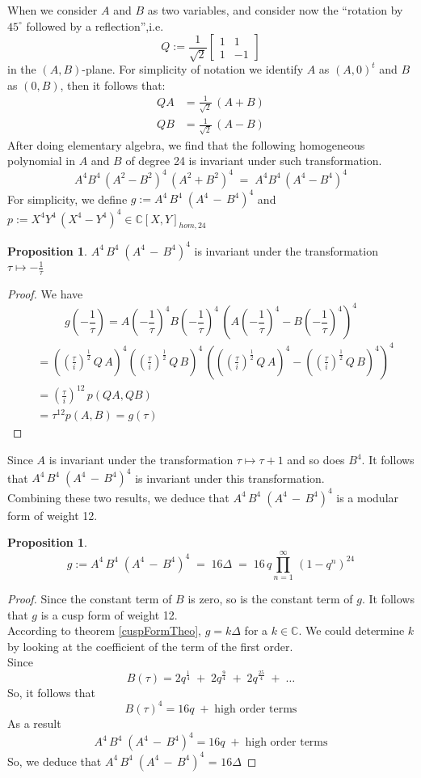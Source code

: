 \documentclass[12pt]{article}
\theoremstyle{definition}
\newtheorem{prop}[theorem]{Proposition}
\numberwithin{equation}{theorem}
\numberwithin{figure}{theorem}
\newcommand{\polyAB}[2]{\ensuremath{#1^4#2^4\,(#1^4 - #2^4)^4}}
\newcommand{\Complex}{\ensuremath{\mathbb{C}}}
\newcommand{\imaginary}{\ensuremath{i}}
\newcommand{\twoFourDegreeAB}{\ensuremath{A^4\,B^4\;(A^4 \,-\, B^4)^4}}
\begin{document}
When we consider $A$ and $B$ as two variables, and consider now the ``rotation by $45^{\circ}$ followed by a reflection'',i.e.
\[
	Q := \frac{1}{\sqrt{2}}
	\left [
	\begin{matrix}
		1 & 1\\
		1 & -1
	\end{matrix}
	\right]
\] in the $(A,B)$-plane. For simplicity of notation we identify $A$ as $(A,0)^t$ and $B$ as $(0,B)$, then it follows that:
\begin{align*}
	QA &= \frac{1}{\sqrt{2}}\,(A + B)\\
	QB &= \frac{1}{\sqrt{2}}\,(A - B) 
\end{align*}
After doing elementary algebra, we find that the following homogeneous polynomial in $A$ and $B$ of degree 24 is invariant under such transformation.
\[
	A^4B^4 \,(A^2 - B^2)^4 \, (A^2 + B^2)^4 \; = \; A^4B^4\,(A^4 - B^4)^4
\]
For simplicity, we define $g := {\twoFourDegreeAB}$  and $p := \polyAB{X}{Y} \in \Complex[X,Y]_{hom,24}$
\begin{prop}\label{twoFourABInvarProp}
	{\twoFourDegreeAB} is invariant under the transformation 
	$\tau \mapsto -\frac{1}{\tau}$
\end{prop}
\begin{proof}
We have
\[
	g(-\frac{1}{\tau}) = \polyAB{A(-\frac{1}{\tau})}{B(-\frac{1}{\tau})}
\]
\begin{align*}
 &= \polyAB{((\frac{\tau}{\imaginary})^{\frac{1}{2}}\,Q\,A)}{((\frac{\tau}{\imaginary})^{\frac{1}{2}}\,Q\,B)}\\
 &= (\frac{\tau}{\imaginary})^{12} \, p(QA, QB) \\
 &= \tau^{12}p(A,B) = g(\tau)
\end{align*}
\end{proof}
Since $A$ is invariant under the transformation $\tau \mapsto \tau + 1$ and so does $B^4$. It follows that {\twoFourDegreeAB} is invariant under this transformation.\\
Combining these two results, we deduce that $\twoFourDegreeAB$ is a modular form of weight 12.
\begin{prop}\label{twoFourDegABDelta}
\[
	g := {\twoFourDegreeAB} \;= \; 16 \Delta \;= \; 16\,q\prod_{n = 1}^{\infty}\,(1 - q^n)^{24}
\]
\end{prop}
\begin{proof}
Since the constant term of $B$ is zero, so is the constant term of $g$. It follows that $g$ is a cusp form of weight 12. \\
According to theorem \ref{cuspFormTheo},  $g = k \Delta$ for a $k \in \Complex$. We could determine $k$ by looking at the coefficient of the term of the first order.\\
Since
\[
	B(\tau) = 2 q^{\frac{1}{4}} \; + \; 2q^{\frac{9}{4}} \;+\; 2q^{\frac{25}{4}} \; + \; \ldots 
\]
So, it follows that
\[
	B(\tau)^4 = 16 q \; + \; \mbox{high order terms}
\]
As a result
\[
	\twoFourDegreeAB = 16 q \; + \; \mbox{high order terms} 
\]
So, we deduce that $\twoFourDegreeAB$ = $16 \Delta$
\end{proof}
\end{document}
